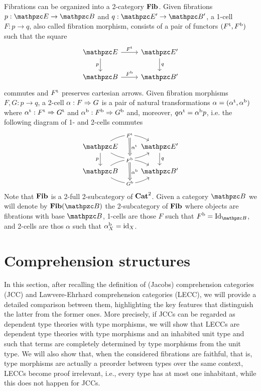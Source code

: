 \documentclass{lmcs} %
\theoremstyle{plain}\newtheorem{satz}[thm]{Satz} %
\begin{document}
Fibrations can be organized into a 2-category $\mathbf{Fib}$. 
Given fibrations $p:\ct{E}\to\ct{B}$ and $q:\ct{E'}\to\ct{B'}$, a 1-cell $F:p\to q$, also called fibration morphism, consists of a pair of functors $({F}^{\mathrm{t}}, {F}^{\mathrm{b}})$ such that the square
				\[\begin{tikzcd}
					\ct{E} \ar[r, "\ft{F}"] 
					\ar[d,"p"'] & 
					\ct{E'} \ar[d,"q"] \\ 
					\ct{B} \ar[r,"\fb{F}"] &
					\ct{B'} 
				\end{tikzcd}\] 
commutes and ${F}^{\mathrm{t}}$ preserves cartesian arrows. 
% 
Given fibration morphisms $F,G : p \to q$, 
 a 2-cell $\alpha:F\Rightarrow G$ is a pair of natural transformations $\alpha=({\alpha}^{\mathrm{t}}, {\alpha}^{\mathrm{b}})$ where ${\alpha}^{\mathrm{t}}:{F}^{\mathrm{t}}\Rightarrow {G}^{\mathrm{t}}$ and ${\alpha}^{\mathrm{b}}:{F}^{\mathrm{b}}\Rightarrow{G}^{\mathrm{b}}$ and, moreover, $q{\alpha}^{\mathrm{t}} = {\alpha}^{\mathrm{b}} p$, i.e. the following diagram of 1- and 2-cells commutes 
				\[\begin{tikzcd}
					{\ct{E}} & {\ct{E'}} \\
					{\ct{B}} & {\ct{B'}}
					\arrow[""{name=0, anchor=center, inner sep=0}, "{{\ft{G}}}"{description}, bend right, from=1-1, to=1-2]
					\arrow[""{name=1, anchor=center, inner sep=0}, "{{\ft{F}}}"{description}, bend left, from=1-1, to=1-2]
					\arrow["p"', from=1-1, to=2-1]
					\arrow["q", from=1-2, to=2-2]
					\arrow[""{name=2, anchor=center, inner sep=0}, "{{\fb{F}}}"{description}, bend left, from=2-1, to=2-2]
					\arrow[""{name=3, anchor=center, inner sep=0}, "{{\fb{G}}}"{description}, bend right, from=2-1, to=2-2]
					\arrow["{\ft{\alpha}}", shorten <=3pt, shorten >=3pt, Rightarrow, from=1, to=0]
					\arrow["{\fb{\alpha}}", shorten <=3pt, shorten >=3pt, Rightarrow, from=2, to=3]
				\end{tikzcd}\]
Note that $\mathbf{Fib}$ is a 2-full 2-subcategory of $\mathbf{Cat}^2$. 
% 
Given a category $\ct{B}$ we will denote by $\Fib(\ct{B})$ the 2-subcategory of $\mathbf{Fib}$ 
where objects are fibrations with base $\ct{B}$, 
1-cells are those $F$ such that $\fb{F} = \Id{\ct{B}}$, and 
2-cells are thos $\alpha$ such that ${\alpha}^{\mathrm{b}}_X = \mathrm{id}_{X}$. 

			

			
			
\section{Comprehension structures}\label{sect:jcomp}
	
In this section, after recalling the definition of (Jacobs) comprehension categories (JCC) and Lawvere-Ehrhard comprehension categories (LECC), 
we will provide a detailed comparison between them, highlighting the key features that distinguish the latter from the former ones. 
More precisely, if JCCs can be regarded as dependent type theories with type morphisms, 
we will show that LECCs are dependent type theories with type morphisms and an inhabited unit type and such that terms are completely determined by type morphisms from the unit type. 
We will also show that, when the considered fibrations are faithful, that is, type morphisms are actually a preorder between types over the same context, 
LECCs become proof irrelevant, i.e., every type has at most one inhabitant, while this does not happen for JCCs. 
\end{document}
